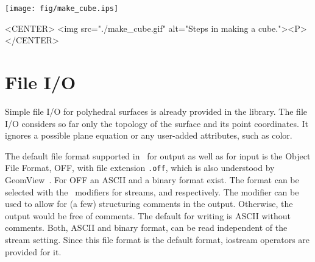 \begin{ccTexOnly}
    \begin{center}
      \parbox{\textwidth}{%
          \texttt{[image: fig/make\_cube.ips]}%
      }
    \end{center}
\end{ccTexOnly}

\begin{ccHtmlOnly}
    <CENTER>
        <img src="./make_cube.gif" alt="Steps in making a cube."><P>
    </CENTER>
\end{ccHtmlOnly}





\section{File I/O}
\label{sectionPolyIO}

Simple file I/O for polyhedral surfaces is already provided in the
library. The file I/O considers so far only the topology of the
surface and its point coordinates. It ignores a possible plane
equation or any user-added attributes, such as color.

The default file format supported in \cgal\ for output as well as for
input is the Object File Format, OFF, with file extension {\tt .off},
which is also understood by GeomView~\cite{cgal:p-gmgv16-96}. For OFF
an ASCII and a binary format exist. The format can be selected with
the \cgal\ modifiers for streams,  and
 respectively. The modifier 
can be used to allow for (a few) structuring comments in the
output. Otherwise, the output would be free of comments.  The default
for writing is ASCII without comments. Both, ASCII and binary format,
can be read independent of the stream setting. Since this file format
is the default format, iostream operators are provided for it.


\ccHtmlNoLinks
{}

\ccHtmlNoLinks
{}


